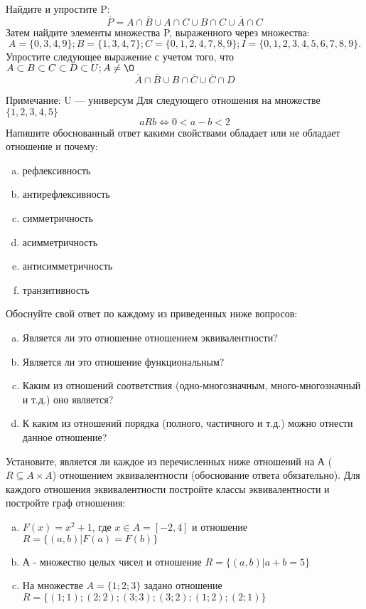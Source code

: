 \documentclass[10pt]{exam}
\begin{document}
\begin{questions}
\question
Найдите и упростите P:
\begin{equation*}
\overline{P} = A \cap \overline{B} \cup A \cap C \cup B \cap C \cup \overline{A} \cap C
\end{equation*}
Затем найдите элементы множества P, выраженного через множества:
\begin{equation*}
A = \{0, 3, 4, 9\}; 
B = \{1, 3, 4, 7\};
C = \{0, 1, 2, 4, 7, 8, 9\};
I = \{0, 1, 2, 3, 4, 5, 6, 7, 8, 9\}.
\end{equation*}\question
Упростите следующее выражение с учетом того, что $A\subset B \subset C \subset D \subset U; A \neq \O$
\begin{equation*}
\overline{A} \cap \overline{B} \cup B \cap \overline{C} \cup \overline{C} \cap D
\end{equation*}

Примечание: U — универсум\question
Для следующего отношения на множестве $\{1, 2, 3, 4, 5\}$ 
\begin{equation*}
aRb \iff 0 < a-b<2
\end{equation*}
Напишите обоснованный ответ какими свойствами обладает или не обладает отношение и почему:   
\begin{enumerate} [a)]\setcounter{enumi}{0}
\item рефлексивность
\item антирефлексивность
\item симметричность
\item асимметричность
\item антисимметричность
\item транзитивность
\end{enumerate}

Обоснуйте свой ответ по каждому из приведенных ниже вопросов:
\begin{enumerate} [a)]\setcounter{enumi}{0}
    \item Является ли это отношение отношением эквивалентности?
    \item Является ли это отношение функциональным?
    \item Каким из отношений соответствия (одно-многозначным, много-многозначный и т.д.) оно является?
    \item К каким из отношений порядка (полного, частичного и т.д.) можно отнести данное отношение?
\end{enumerate}
\question
Установите, является ли каждое из перечисленных ниже отношений на А ($R \subseteq A \times A$) отношением эквивалентности (обоснование ответа обязательно). Для каждого отношения эквивалентности постройте классы эквивалентности и постройте граф отношения:
\begin{enumerate} [a)]\setcounter{enumi}{0}
\item $F(x)=x^{2}+1$, где $x \in A = [-2, 4]$ и отношение $R = \{(a,b)|F(a) = F(b)\}$
\item А - множество целых чисел и отношение $R = \{(a,b)|a + b = 5\}$
\item На множестве $A = \{1; 2; 3\}$ задано отношение $R = \{(1; 1); (2; 2); (3; 3); (3; 2); (1; 2); (2; 1)\}$


\end{enumerate}
\end{questions}
\end{document}
